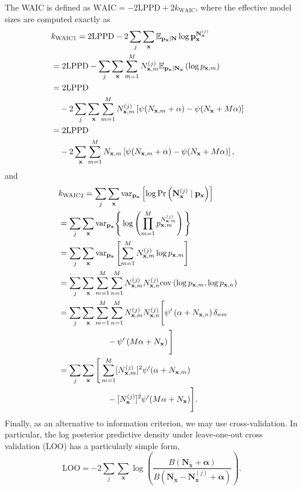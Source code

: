\documentclass[prl,twocolumn,groupedaddress]{revtex4-1}
\newcommand{\bN}{\mathbf{N}}
\newcommand{\bx}{\mathbf{x}}
\newcommand{\bp}{\mathbf{p}}
\newcommand{\balpha}{{\boldsymbol\alpha}}
\newcommand{\var}{\mathrm{var}}
\newcommand{\cov}{\mathrm{cov}}
\begin{document}
The WAIC is defined as $\textrm{WAIC} = -2\textrm{LPPD}+2k_{\textrm{WAIC}}$, where the effective model sizes are computed exactly as
\begin{align}
\lefteqn{k_{\textrm{WAIC1}} = 2\textrm{LPPD}-2\sum_j \sum_\bx \mathbb{E}_{\bp_\bx\vert\bN}\log\bp_\bx^{\bN_{\bx}^{(j)}}  }\nonumber \\
&= 2 \textrm{LPPD} -  \sum_j\sum_{\bx}\sum_{m=1}^M N_{\bx,m}^{(j)} \mathbb{E}_{\bp_\bx\vert \bN_\bx} \left(\log p_{\bx,m} \right) \nonumber\\
& = 2 \textrm{LPPD} \nonumber\\
&\quad- 2\sum_j \sum_\bx  \sum_{m=1}^MN_{\bx,m}^{(j)} \left[ \psi(N_{\bx,m}+ \alpha ) - \psi(N_{\bx}  + M\alpha ) \right]  \nonumber\\
&= 2 \textrm{LPPD} \nonumber\\
&\quad- 2\sum_{\bx}\sum_{m=1}^M N_{\bx,m}\left[ \psi(N_{\bx,m}+ \alpha ) - \psi(N_{\bx}  + M\alpha ) \right],
\end{align}
and
\begin{align}
\lefteqn{k_{\textrm{WAIC2}} =\sum_j \sum_\bx \var_{\bp_\bx}\left[ \log  \Pr\left(\mathbf{N}^{(j)}_{\bx} \mid \bp_\bx \right)   \right] }\nonumber \\
&=\sum_j\sum_{\bx} \var_{\bp_\bx}\Bigg\{ \log\left( %
\prod_{m=1}^{M} p_{\bx,m}^{N^{(j)}_{\bx,m}} \right)   \Bigg\} \nonumber\\
&=\sum_j\sum_\bx   \var_{\bp_\bx}\left[  \sum_{m=1}^M N^{(j)}_{\bx,m} \log p_{\bx,m} \right] \nonumber\\
&= \sum_j\sum_\bx \sum_{m=1}^M \sum_{n=1}^M N^{(j)}_{\bx,m} N^{(j)}_{\bx,n} \cov\left( \log p_{\bx,m}, \log p_{\bx,n} \right) \nonumber\\
&= \sum_j\sum_\bx \sum_{m=1}^M \sum_{n=1}^M N^{(j)}_{\bx,m} N^{(j)}_{\bx,n}\Bigg[  \psi^\prime\left( \alpha+N_{\bx,n} \right)\delta_{nm} \nonumber\\
&\qquad\qquad\qquad- \psi^\prime\left( M\alpha+N_\bx \right) \Bigg] \nonumber\\
&=\sum_j \sum_\bx \Bigg[\sum_{m=1}^M [N^{(j)}_{\bx,m}]^2\psi^\prime(\alpha+N_{\bx,m}) \nonumber\\
&\qquad\qquad\qquad-[N^{(j)}_{\bx}]^2\psi^\prime(M\alpha+N_\bx)  \Bigg].
\end{align}
Finally, as an alternative to information criterion, we may use cross-validation. In particular, the log posterior predictive density under leave-one-out cross validation (LOO)
has a particularly simple form,
\begin{equation}
\textrm{LOO} = -2\sum_j \sum_{\bx}  \log\left(  \frac{B(\bN_\bx  +\balpha)}{B(\bN_\bx -\bN_{\bx}^{(j)} +\balpha)} \right) .
\end{equation}
\end{document}
